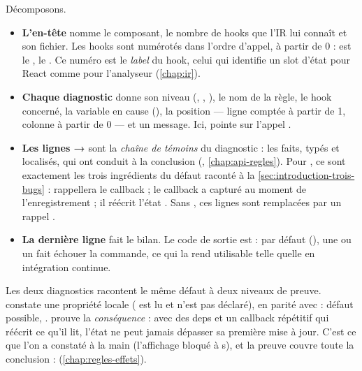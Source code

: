 Décomposons.
\begin{itemize}
  \item \textbf{L'en-tête}  nomme le composant,
    le nombre de hooks que l'IR lui connaît et son fichier. Les hooks sont
    numérotés dans l'ordre d'appel, à partir de 0 : \code{[hook:0]} est le
    , \code{[hook:1]} le . Ce numéro est le
    \emph{label} du hook, celui qui identifie un slot d'état pour React comme
    pour l'analyseur (\cref{chap:ir}).
  \item \textbf{Chaque diagnostic} donne son niveau (,
    , ), le nom de la règle, le hook concerné, la
    variable en cause (), la position 
    --- ligne comptée à partir de 1, colonne à partir de 0 --- et un message.
    Ici,  pointe sur l'appel .
  \item \textbf{Les lignes \og →\fg{}} sont la \emph{chaîne de témoins} du
    diagnostic : les faits, typés et localisés, qui ont conduit à la
    conclusion (, \cref{chap:api-regles}). Pour
    , ce sont exactement les trois ingrédients du défaut
    raconté à la \cref{sec:introduction-trois-bugs} : 
    rappellera le callback ; le callback a capturé  au moment
    de l'enregistrement ; il réécrit l'état . Sans
    , ces lignes sont remplacées par un rappel
    .
  \item \textbf{La dernière ligne} fait le bilan. Le code de sortie est
     : par défaut (), une \Error{} ou un
    \Warning{} fait échouer la commande, ce qui la rend utilisable telle quelle
    en intégration continue.
\end{itemize}

Les deux diagnostics racontent le même défaut à deux niveaux de preuve.
 constate une propriété locale ( est lu
et n'est pas déclaré), en parité avec  : défaut
possible, \Warning.  prouve la \emph{conséquence} : avec
des deps \code{[]} et un callback répétitif qui réécrit ce qu'il lit, l'état
ne peut jamais dépasser sa première mise à jour. C'est ce que l'on a constaté
à la main (l'affichage bloqué à  s\fg{}), et la preuve couvre toute la
conclusion : \Error{} (\cref{chap:regles-effets}).

